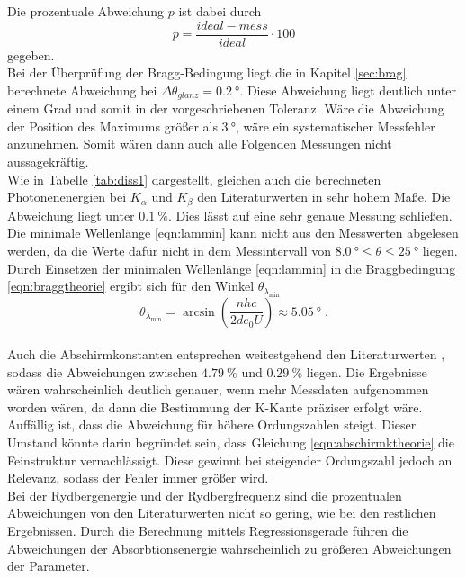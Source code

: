 Die prozentuale Abweichung $p$ ist dabei durch 
\begin{equation*}
  p=\frac{ideal-mess}{ideal}\cdot \num{100}
\end{equation*}
gegeben.
\\\noindent
Bei der Überprüfung der Bragg-Bedingung liegt die in Kapitel \ref{sec:brag} berechnete Abweichung bei $\Delta\theta_{glanz}=\SI{0.2}{\degree}$.
Diese Abweichung liegt deutlich unter einem Grad und somit in der vorgeschriebenen Toleranz. Wäre die Abweichung der Position des Maximums 
größer als $\SI{3}{\degree}$, wäre ein systematischer Messfehler anzunehmen. Somit wären dann auch alle Folgenden Messungen nicht aussagekräftig.
\\\noindent
Wie in Tabelle \ref{tab:diss1} dargestellt, gleichen auch die berechneten Photonenenergien bei $K_\alpha$ und $K_\beta$
den Literaturwerten in sehr hohem Maße. Die Abweichung liegt unter $\SI{0.1}{\percent}$. Dies lässt auf eine sehr genaue Messung schließen.
\\\noindent
Die minimale Wellenlänge \eqref{eqn:lammin} kann nicht aus den Messwerten abgelesen werden, da die Werte dafür nicht in dem Messintervall von 
$\SI{8.0}{\degree}\leq\theta\leq\SI{25}{\degree}$ liegen. Durch Einsetzen der minimalen Wellenlänge \eqref{eqn:lammin} in die Braggbedingung
\eqref{eqn:braggtheorie} ergibt sich für den Winkel $\theta_{\lambda_\text{min}}$ 
\begin{equation*}
  \theta_{\lambda_\text{min}}=\arcsin{\left(\frac{nhc}{2de_0U}\right)}\approx\SI{5.05}{\degree} \;.
\end{equation*} 
\\\noindent
Auch die Abschirmkonstanten entsprechen weitestgehend den Literaturwerten \cite{AP05}, sodass die Abweichungen zwischen $\SI{4.79}{\percent}$
und $\SI{0.29}{\percent}$ liegen. Die Ergebnisse wären wahrscheinlich deutlich genauer, wenn mehr Messdaten aufgenommen worden wären, da
dann die Bestimmung der K-Kante präziser erfolgt wäre. Auffällig ist, dass die Abweichung für höhere Ordungszahlen steigt. Dieser Umstand 
könnte darin begründet sein, dass Gleichung \ref{eqn:abschirmktheorie} die Feinstruktur vernachlässigt. Diese gewinnt bei steigender Ordungszahl
jedoch an Relevanz, sodass der Fehler immer größer wird.
\\\noindent
Bei der Rydbergenergie und der Rydbergfrequenz sind die prozentualen Abweichungen von den Literaturwerten \cite{AP06} nicht so gering, wie bei
den restlichen Ergebnissen. Durch die Berechnung mittels Regressionsgerade führen die Abweichungen der Absorbtionsenergie wahrscheinlich
zu größeren Abweichungen der Parameter.


% 